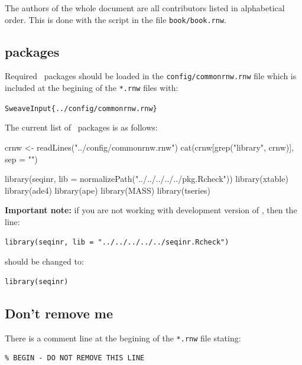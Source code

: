 \documentclass{article}
\begin{document}
The authors of the whole document are all contributors listed
in alphabetical order. This is done with the script in the file
\texttt{book/book.rnw}.

\subsection{\Rlogo{} packages}

Required \Rlogo{}~packages should be loaded in the 
\texttt{config/commonrnw.rnw} file which is included
at the begining of the \texttt{*.rnw} files with:


\vspace{0.2cm}
\noindent\texttt{SweaveInput\{../config/commonrnw.rnw\}}
\vspace{0.2cm}

The current list of \Rlogo{}~packages is as follows:

\begin{Schunk}
\begin{Sinput}
 crnw <- readLines("../config/commonrnw.rnw")
 cat(crnw[grep("library", crnw)], sep = "\n")
\end{Sinput}
\begin{Soutput}
library(seqinr, lib = normalizePath("../../../../../pkg.Rcheck"))
library(xtable)
library(ade4)
library(ape)
library(MASS)
library(tseries)
\end{Soutput}
\end{Schunk}

\textbf{Important note:} if you are not working with development 
version of \seqinr{}, then the line:

\begin{verbatim}
library(seqinr, lib = "../../../../../seqinr.Rcheck")
\end{verbatim}

should be changed to:

\begin{verbatim}
library(seqinr)
\end{verbatim}

\subsection{Don't remove me}

There is a comment line at the begining of the \texttt{*.rnw} file stating:

\begin{verbatim}
% BEGIN - DO NOT REMOVE THIS LINE
\end{verbatim}
\end{document}
